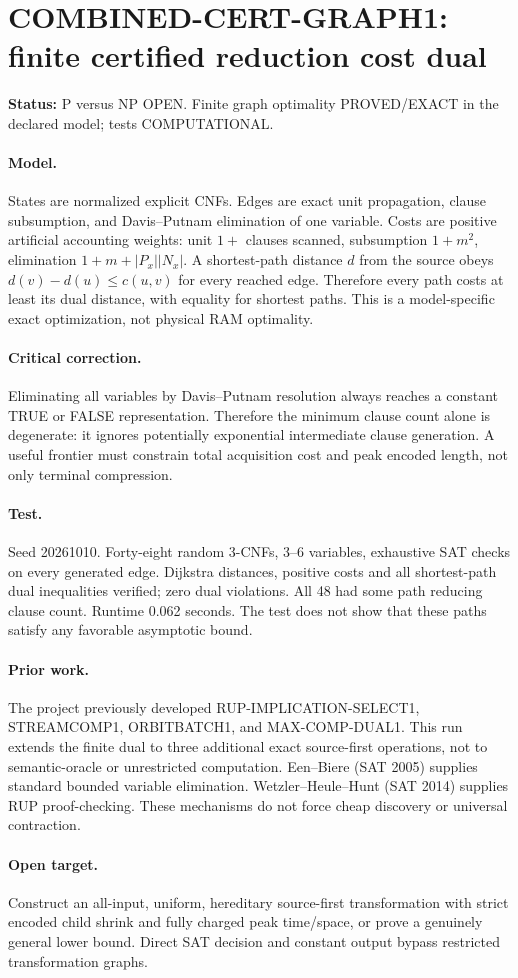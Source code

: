 \documentclass{article}
\begin{document}
\section*{COMBINED-CERT-GRAPH1: finite certified reduction cost dual}
\textbf{Status:} P versus NP OPEN. Finite graph optimality PROVED/EXACT in the declared model; tests COMPUTATIONAL.
\paragraph{Model.} States are normalized explicit CNFs. Edges are exact unit propagation, clause subsumption, and Davis--Putnam elimination of one variable. Costs are positive artificial accounting weights: unit $1+$ clauses scanned, subsumption $1+m^2$, elimination $1+m+|P_x||N_x|$. A shortest-path distance $d$ from the source obeys $d(v)-d(u)\le c(u,v)$ for every reached edge. Therefore every path costs at least its dual distance, with equality for shortest paths. This is a model-specific exact optimization, not physical RAM optimality.
\paragraph{Critical correction.} Eliminating all variables by Davis--Putnam resolution always reaches a constant TRUE or FALSE representation. Therefore the minimum clause count alone is degenerate: it ignores potentially exponential intermediate clause generation. A useful frontier must constrain total acquisition cost and peak encoded length, not only terminal compression.
\paragraph{Test.} Seed 20261010. Forty-eight random 3-CNFs, 3--6 variables, exhaustive SAT checks on every generated edge. Dijkstra distances, positive costs and all shortest-path dual inequalities verified; zero dual violations. All 48 had some path reducing clause count. Runtime 0.062 seconds. The test does not show that these paths satisfy any favorable asymptotic bound.
\paragraph{Prior work.} The project previously developed RUP-IMPLICATION-SELECT1, STREAMCOMP1, ORBITBATCH1, and MAX-COMP-DUAL1. This run extends the finite dual to three additional exact source-first operations, not to semantic-oracle or unrestricted computation. Een--Biere (SAT 2005) supplies standard bounded variable elimination. Wetzler--Heule--Hunt (SAT 2014) supplies RUP proof-checking. These mechanisms do not force cheap discovery or universal contraction.
\paragraph{Open target.} Construct an all-input, uniform, hereditary source-first transformation with strict encoded child shrink and fully charged peak time/space, or prove a genuinely general lower bound. Direct SAT decision and constant output bypass restricted transformation graphs.
\end{document}

